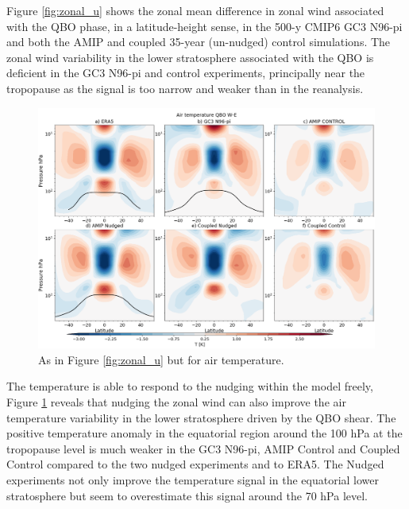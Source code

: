 Figure \ref{fig:zonal_u} shows the zonal mean difference in zonal wind associated with the QBO phase, in a latitude-height sense, in the 500-y CMIP6 GC3 N96-pi and both the AMIP and coupled 35-year (un-nudged) control simulations. The zonal wind variability in the lower stratosphere associated with the QBO is deficient in the GC3 N96-pi and control experiments, principally near the tropopause as the signal is too narrow and weaker than in the reanalysis.
 
\begin{figure}[t!]
\centering
 \includegraphics[width=\linewidth]{figures/zonalplotair_temperature.png}
\caption[Zonal mean air temperature QBO difference]{As in Figure \ref{fig:zonal_u} but for air temperature.  }
\label{fig:zonal_T}
\end{figure} 




The temperature is able to respond to the nudging within the model freely, Figure \ref{fig:zonal_T} reveals that nudging the zonal wind can also improve the air temperature variability in the lower stratosphere driven by the QBO shear. The positive temperature anomaly in the equatorial region around the 100 hPa at the tropopause level is much weaker in the GC3 N96-pi, AMIP Control and Coupled Control compared to the two nudged experiments and to ERA5. The Nudged experiments not only improve the temperature signal in the equatorial lower stratosphere but seem to overestimate this signal around the 70 hPa level. 

